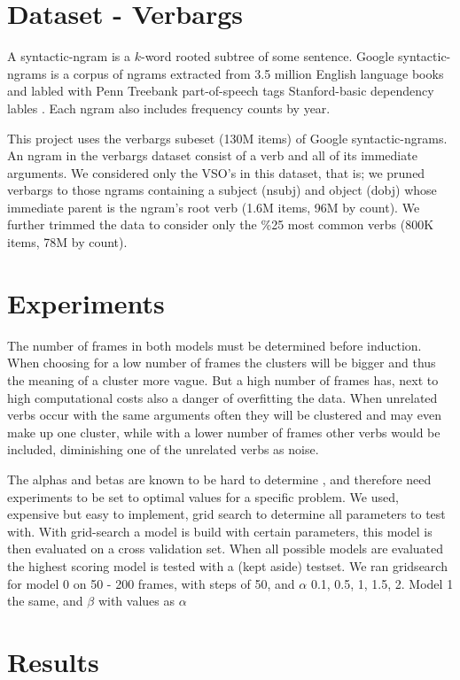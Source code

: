 \documentclass{article} %
\begin{document}
\section{Dataset - Verbargs}
\label{data}

A syntactic-ngram is a $k$-word rooted subtree of some sentence.
Google syntactic-ngrams is a corpus of ngrams extracted from 3.5 million English language 
books and labled with Penn Treebank part-of-speech tags Stanford-basic dependency 
lables \citep{ngrams2013}.
Each ngram also includes frequency counts by year.

This project uses the verbargs subeset (130M items) of Google syntactic-ngrams.
An ngram in the verbargs dataset consist of a verb and all of its 
immediate arguments.
We considered only the VSO's in this dataset, that is; we pruned verbargs to
those ngrams containing a subject (nsubj) and object (dobj) whose immediate parent
is the ngram's root verb (1.6M items, 96M by count). 
We further trimmed the data to consider only the \%25 most common verbs 
(800K items, 78M by count).



\section{Experiments}
The number of frames in both models must be determined before induction. When choosing for a low number of frames the clusters will be bigger and thus the meaning of a cluster more vague. But a high number of frames has, next to high computational costs also a danger of overfitting the data. When unrelated verbs occur with the same arguments often they will be clustered and may even make up one cluster, while with a lower number of frames other verbs would be included, diminishing one of the unrelated verbs as noise.

The alphas and betas are known  to be hard to determine \citep{oconnor2013}, and therefore need experiments to be set to optimal values for a specific problem. We used, expensive but easy to implement, grid search to determine all parameters to test with. With grid-search a model is build with certain parameters, this model is then evaluated on a cross validation set. When all possible models are evaluated the highest scoring model is tested with a (kept aside) testset. We ran gridsearch for model 0 on 50 - 200 frames, with steps of 50, and $\alpha$ 0.1, 0.5, 1, 1.5, 2. Model 1 the same, and $\beta$ with values as $\alpha$

\section{Results}
\label{results}
\end{document}
